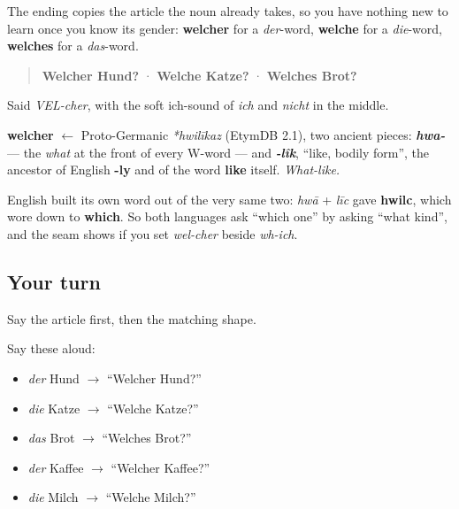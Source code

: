 The ending copies the article the noun already takes, so you have nothing new to learn once you know its gender: \textbf{welcher} for a \emph{der}-word, \textbf{welche} for a \emph{die}-word, \textbf{welches} for a \emph{das}-word.

\begin{quote}
\textbf{Welcher Hund?} · \textbf{Welche Katze?} · \textbf{Welches Brot?}
\end{quote}

Said \emph{VEL-cher}, with the soft ich-sound of \emph{ich} and \emph{nicht} in the middle.

\begin{cousinweb}
\textbf{welcher} $\leftarrow$ Proto-Germanic \emph{*hwilīkaz} (EtymDB 2.1), two ancient pieces: \emph{\textbf{hwa-}} — the \emph{what} at the front of every W-word — and \emph{\textbf{-lîk}}, \textquotedblleft{}like, bodily form\textquotedblright{}, the ancestor of English \textbf{-ly} and of the word \textbf{like} itself. \emph{What-like.}

English built its own word out of the very same two: \emph{hwā} + \emph{līc} gave \textbf{hwilc}, which wore down to \textbf{which}. So both languages ask \textquotedblleft{}which one\textquotedblright{} by asking \textquotedblleft{}what kind\textquotedblright{}, and the seam shows if you set \emph{wel-cher} beside \emph{wh-ich}.
\end{cousinweb}

\subsection*{Your turn}
Say the article first, then the matching shape.

Say these aloud:

\begin{itemize}
\raggedright
  \item \emph{der} Hund $\to$ \textquotedblleft{}Welcher Hund?\textquotedblright{}
  \item \emph{die} Katze $\to$ \textquotedblleft{}Welche Katze?\textquotedblright{}
  \item \emph{das} Brot $\to$ \textquotedblleft{}Welches Brot?\textquotedblright{}
  \item \emph{der} Kaffee $\to$ \textquotedblleft{}Welcher Kaffee?\textquotedblright{}
  \item \emph{die} Milch $\to$ \textquotedblleft{}Welche Milch?\textquotedblright{}
\end{itemize}

